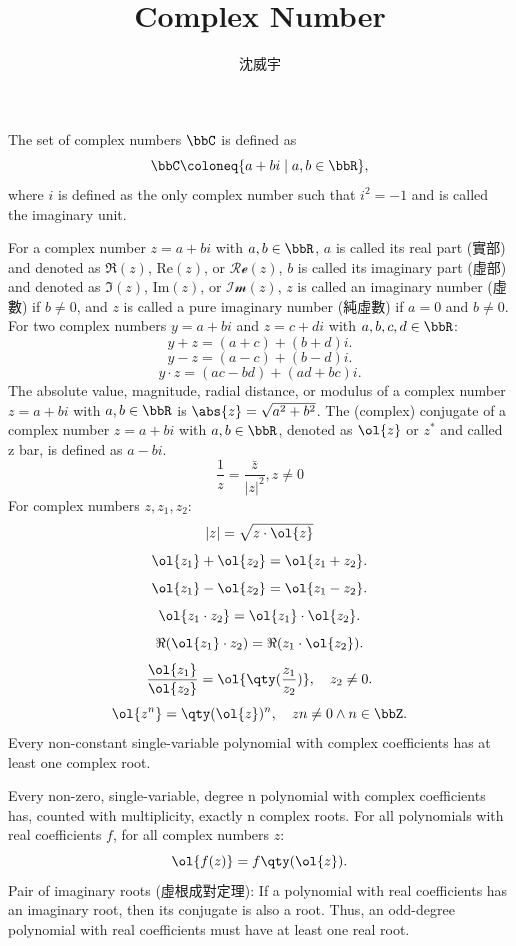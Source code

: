 \documentclass[a4paper,12pt]{article}
\begin{document}
\title{Complex Number}
\author{沈威宇}
\date{\temtoday}
\titletocdoc
{}
The set of complex numbers $\bbC$ is defined as
\[\bbC\coloneq\{a+bi\mid a,b\in\bbR\},\]
where $i$ is defined as the only complex number such that $i^2=-1$ and is called the imaginary unit.

For a complex number $z=a+bi$ with $a,b\in\bbR$, $a$ is called its real part (實部) and denoted as $\Re(z)$, $\mathrm{Re}(z)$, or $\mathcal{Re}(z)$, $b$ is called its imaginary part (虛部) and denoted as $\Im(z)$, $\mathrm{Im}(z)$, or $\mathcal{Im}(z)$, $z$ is called an imaginary number (虛數) if $b\neq 0$, and $z$ is called a pure imaginary number (純虛數) if $a=0$ and $b\neq 0$.
For two complex numbers $y=a+bi$ and $z=c+di$ with $a,b,c,d\in\bbR$:
\[y+z=(a+c)+(b+d)i.\]
\[y-z=(a-c)+(b-d)i.\]
\[y\cdot z=(ac-bd)+(ad+bc)i.\]
The absolute value, magnitude, radial distance, or modulus of a complex number $z=a+bi$ with $a,b\in\bbR$ is $\abs{z}=\sqrt{a^2+b^2}$.
The (complex) conjugate of a complex number $z=a+bi$ with $a,b\in\bbR$, denoted as $\ol{z}$ or $z^*$ and called z bar, is defined as $a-bi$.
\[\frac{1}{z}=\frac{\bar{z}}{|z|^2},z\neq 0\]
For complex numbers $z,z_1,z_2$:
\[|z|=\sqrt{z\cdot\ol{z}}\]
\[\ol{z_1}+\ol{z_2}=\ol{z_1+z_2}.\]
\[\ol{z_1}-\ol{z_2}=\ol{z_1-z_2}.\]
\[\ol{z_1\cdot z_2}=\ol{z_1}\cdot\ol{z_2}.\]
\[\Re(\ol{z_1}\cdot z_2)=\Re(z_1\cdot\ol{z_2}).\]
\[\frac{\ol{z_1}}{\ol{z_2}}=\ol{\qty(\frac{z_1}{z_2})},\quad z_2\neq 0.\]
\[\ol{z^n}=\qty(\ol{z})^n,\quad zn\neq 0\land n\in\bbZ.\]
Every non-constant single-variable polynomial with complex coefficients has at least one complex root.

Every non-zero, single-variable, degree n polynomial with complex coefficients has, counted with multiplicity, exactly n complex roots.
For all polynomials with real coefficients $f$, for all complex numbers $z$:
\[\ol{f(z)}=f\qty(\ol{z}).\]
Pair of imaginary roots (虛根成對定理): If a polynomial with real coefficients has an imaginary root, then its conjugate is also a root. Thus, an odd-degree polynomial with real coefficients must have at least one real root.
\end{document}
